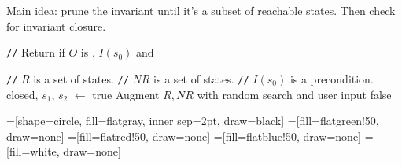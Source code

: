 \begin{frame}
  \begin{center}
    \Huge
    Main idea: prune the invariant until it's a subset of reachable states.
    Then check for invariant closure.
  \end{center}

\end{frame}

\newcommand{\algocomment}[1]{\State \textcolor{flatdenim}{\texttt{//} #1}}

\begin{frame}
  \begin{algorithmic}
    \algocomment{Return if $O$ is \sTIconfluent{}.}
      \State
      \Return $I(s_0)$ and
    \EndFunction

    \State

    \algocomment{$R$ is a set of \sTIreachable{} states.}
    \algocomment{$NR$ is a set of \sTIunreachable{} states.}
    \algocomment{$I(s_0)$ is a precondition.}
      \State closed, $s_1$, $s_2$ $\gets$ 
        \Return true
      \EndIf
      \State Augment $R, NR$ with random search and user input
        \Return false
      \EndIf
      \State \Return {}
    \EndFunction
  \end{algorithmic}

\end{frame}

=[shape=circle, fill=flatgray, inner sep=2pt, draw=black]
=[fill=flatgreen!50, draw=none]
=[fill=flatred!50, draw=none]
=[fill=flatblue!50, draw=none]
=[fill=white, draw=none]

\newcommand{\pointgrid}[4]{{
  \newcommand{\argxmin}{#1}
  \newcommand{\argxmax}{#2}
  \newcommand{\argymin}{#3}
  \newcommand{\argymax}{#4}

  \draw[] (\argxmin, 0) to (\argxmax, 0);
  \draw[] (0, \argymin) to (0, \argymax);
  \foreach \x in {\argxmin, ..., \argxmax} {
    \foreach \y in {\argymin, ..., \argymax} {
      \node[point] (\x-\y) at (\x, \y) {};
    }
  }
}}

